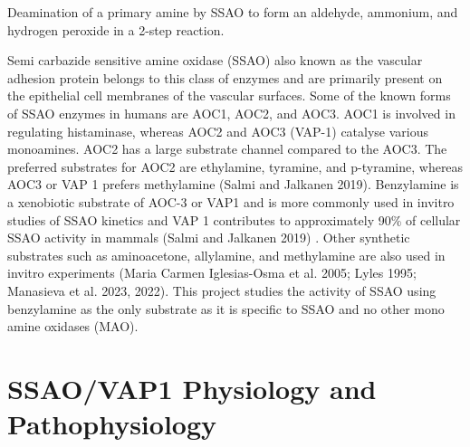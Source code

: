 \documentclass[
  letterpaper,
  DIV=11,
  numbers=noendperiod]{scrreprt}
\begin{document}
\begin{fig}


\caption{\label{fig-Deamination_of_primaryamine_SSAO}Deamination of a
primary amine by SSAO to form an aldehyde, ammonium, and hydrogen
peroxide in a 2-step reaction.}

\end{fig}%

Semi carbazide sensitive amine oxidase (SSAO) also known as the vascular
adhesion protein belongs to this class of enzymes and are primarily
present on the epithelial cell membranes of the vascular surfaces. Some
of the known forms of SSAO enzymes in humans are AOC1, AOC2, and AOC3.
AOC1 is involved in regulating histaminase, whereas AOC2 and AOC3
(VAP-1) catalyse various monoamines. AOC2 has a large substrate channel
compared to the AOC3. The preferred substrates for AOC2 are ethylamine,
tyramine, and p-tyramine, whereas AOC3 or VAP 1 prefers methylamine
(Salmi and Jalkanen 2019). Benzylamine is a xenobiotic substrate of
AOC-3 or VAP1 and is more commonly used in invitro studies of SSAO
kinetics and VAP 1 contributes to approximately 90\% of cellular SSAO
activity in mammals (Salmi and Jalkanen 2019) . Other synthetic
substrates such as aminoacetone, allylamine, and methylamine are also
used in invitro experiments (Maria Carmen Iglesias-Osma et al. 2005;
Lyles 1995; Manasieva et al. 2023, 2022). This project studies the
activity of SSAO using benzylamine as the only substrate as it is
specific to SSAO and no other mono amine oxidases (MAO).

\section{\texorpdfstring{\textbf{SSAO/VAP1 Physiology and
Pathophysiology}}{SSAO/VAP1 Physiology and Pathophysiology}}\label{ssaovap1-physiology-and-pathophysiology}
\end{document}
